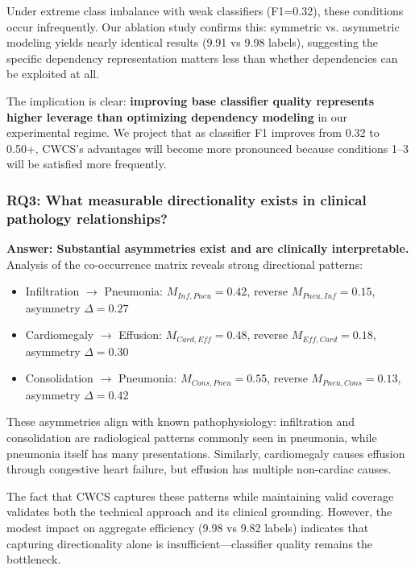Under extreme class imbalance with weak classifiers (F1=0.32), these conditions occur infrequently. Our ablation study confirms this: symmetric vs. asymmetric modeling yields nearly identical results (9.91 vs 9.98 labels), suggesting the specific dependency representation matters less than whether dependencies can be exploited at all.

The implication is clear: \textbf{improving base classifier quality represents higher leverage than optimizing dependency modeling} in our experimental regime. We project that as classifier F1 improves from 0.32 to 0.50+, CWCS's advantages will become more pronounced because conditions 1--3 will be satisfied more frequently.

\subsubsection{RQ3: What measurable directionality exists in clinical pathology relationships?}

\textbf{Answer: Substantial asymmetries exist and are clinically interpretable.} Analysis of the co-occurrence matrix reveals strong directional patterns:

\begin{itemize}
    \item Infiltration $\rightarrow$ Pneumonia: $M_{Inf,Pneu} = 0.42$, reverse $M_{Pneu,Inf} = 0.15$, asymmetry $\Delta = 0.27$
    \item Cardiomegaly $\rightarrow$ Effusion: $M_{Card,Eff} = 0.48$, reverse $M_{Eff,Card} = 0.18$, asymmetry $\Delta = 0.30$
    \item Consolidation $\rightarrow$ Pneumonia: $M_{Cons,Pneu} = 0.55$, reverse $M_{Pneu,Cons} = 0.13$, asymmetry $\Delta = 0.42$
\end{itemize}

These asymmetries align with known pathophysiology: infiltration and consolidation are radiological patterns commonly seen in pneumonia, while pneumonia itself has many presentations. Similarly, cardiomegaly causes effusion through congestive heart failure, but effusion has multiple non-cardiac causes.

The fact that CWCS captures these patterns while maintaining valid coverage validates both the technical approach and its clinical grounding. However, the modest impact on aggregate efficiency (9.98 vs 9.82 labels) indicates that capturing directionality alone is insufficient---classifier quality remains the bottleneck.

